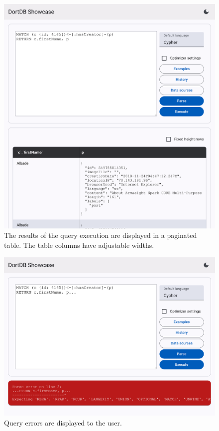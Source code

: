 \begin{figure}[!h]
    \centering
    \includegraphics[width=0.8\linewidth]{img/showcase_execute.png}
    \caption{The results of the query execution are displayed in a paginated table. The table columns have adjustable widths.}
\end{figure}

\begin{figure}[!h]
    \centering
    \includegraphics[width=0.8\linewidth]{img/showcase_error.png}
    \caption{Query errors are displayed to the user.}
\end{figure}

